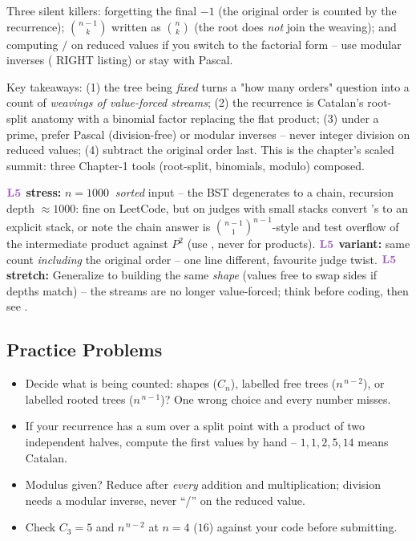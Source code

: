 \begin{warningbox}
Three silent killers: forgetting the final $-1$ (the original order is counted by the
recurrence); $\binom{n-1}{k}$ written as $\binom{n}{k}$ (the root does \emph{not} join
the weaving); and computing $/$ on reduced values if you switch to the factorial form
-- use modular inverses ( RIGHT listing) or stay with Pascal.
\end{warningbox}

\begin{insightbox}
Key takeaways: (1) the tree being \emph{fixed} turns a "how many orders" question into a
count of \emph{weavings of value-forced streams}; (2) the recurrence is Catalan's
root-split anatomy with a binomial factor replacing the flat product; (3) under a prime,
prefer Pascal (division-free) or modular inverses -- never integer division on reduced
values; (4) subtract the original order last. This is the chapter's scaled summit: three
Chapter-1 tools (root-split, binomials, modulo) composed.
\end{insightbox}

\begin{hardeningbox}
\textbf{$\lv5$ stress:} $n=1000\ $ \emph{sorted} input -- the BST degenerates to a
chain, recursion depth $\approx 1000$: fine on LeetCode, but on judges with small
stacks convert 's  to an explicit stack, or note
the chain answer is $\binom{n-1}{1}^{n-1}$-style and test overflow of the intermediate
product against $P^2$ (use , never  for products).
\textbf{$\lv5$ variant:} same count \emph{including} the original order -- one line
different, favourite judge twist. \textbf{$\lv5$ stretch:} Generalize to building the
same \emph{shape} (values free to swap sides if depths match) -- the streams are no
longer value-forced; think before coding, then see .
\end{hardeningbox}

\subsection{Practice Problems}

\begin{stuckbox}
\begin{itemize}[nosep, leftmargin=1.4em]
  \item Decide what is being counted: shapes ($C_n$), labelled free trees ($n^{\,n-2}$),
        or labelled rooted trees ($n^{\,n-1}$)? One wrong choice and every number misses.
  \item If your recurrence has a sum over a split point with a product of two independent
        halves, compute the first values by hand -- $1,1,2,5,14$ means Catalan.
  \item Modulus given? Reduce after \emph{every} addition and multiplication; division
        needs a modular inverse, never ``/'' on the reduced value.
  \item Check $C_3 = 5$ and $n^{\,n-2}$ at $n=4$ ($16$) against your code before submitting.
\end{itemize}
\end{stuckbox}

